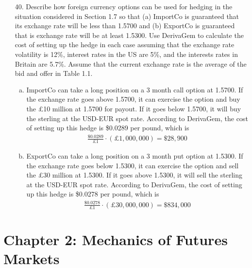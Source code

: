 \documentclass{article}
\begin{document}
\begin{itemize}
	\item[40.] Describe how foreign currency options can be used for hedging in the situation considered in Section 1.7 so that (a) ImportCo is guaranteed that its exchange rate will be less than 1.5700 and (b) ExportCo is guaranteed that is exchange rate will be at least 1.5300. Use DerivaGem to calculate the cost of setting up the hedge in each case assuming that the exchange rate volatility is 12\%, interest rates in the US are 5\%, and the interests rates in Britain are 5.7\%. Assume that the current exchange rate is the average of the bid and offer in Table 1.1.
		\begin{soln}
			\begin{enumerate}[(a)]
				\item ImportCo can take a long position on a 3 month call option at 1.5700. If the exchange rate goes above 1.5700, it can exercise the option and buy the \pounds10 million at 1.5700 for payout. If it goes below 1.5700, it will buy the sterling at the USD-EUR spot rate. According to DerivaGem, the cost of setting up this hedge is \$0.0289 per pound, which is
					\begin{align*}
						\frac{\$0.0289}{\pounds1}\cdot(\pounds 1, 000, 000) = \$28, 900
					\end{align*}

				\item ExportCo can take a long position on a 3 month put option at 1.5300. If the exchange rate goes below 1.5300, it can exercise the option and sell the \pounds30 million at 1.5300. If it goes above 1.5300, it will sell the sterling at the USD-EUR spot rate. According to DerivaGem, the cost of setting up this hedge is \$0.0278 per pound, which is
					\begin{align*}
						\frac{\$0.0278}{\pounds1}\cdot(\pounds30, 000, 000) = \$834, 000
					\end{align*}

			\end{enumerate}
		\end{soln}
		
\end{itemize}

\section*{Chapter 2: Mechanics of Futures Markets}
\end{document}
